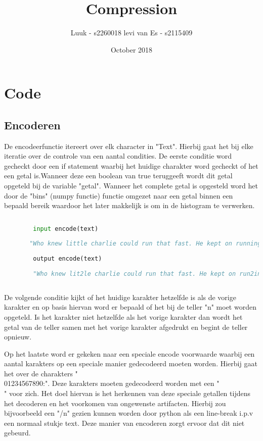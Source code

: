 \documentclass{article}
\title{Compression}
\author{Luuk - s2260018 levi van Es - s2115409 }
\date{October 2018}
\begin{document}
\maketitle

\section{Code}

    \subsection{Encoderen}
       De encodeerfunctie itereert over elk character in "Text". Hierbij gaat het bij elke iteratie over de controle van een aantal condities. De eerste conditie word gecheckt door een if statement waarbij het huidige charakter word gecheckt of het een getal is.Wanneer deze een boolean van true teruggeeft wordt dit getal opgeteld bij de variable "getal". Wanneer het complete getal is opgesteld word het door de "bins" (numpy functie) functie omgezet naar een getal binnen een bepaald bereik waardoor het later makkelijk is om in de histogram te verwerken.
       
       
       \begin{lstlisting}[frame=single, language=python]  % Start your code-block
        
        input encode(text)
        
       "Who knew little charlie could run that fast. He kept on running faster fasteer and fasteeeeeerr !"
        
        output encode(text) 
        
        "Who knew lit2le charlie could run that fast. He kept on run2ing faster faste2r and faste6r2 !"
 

        \end{lstlisting}

       
       De volgende conditie kijkt of het huidige karakter hetzelfde is als de vorige karakter en op basis hiervan word er bepaald of het bij de teller "n" moet worden opgeteld. Is het karakter niet hetzelfde als het vorige karakter dan wordt het getal van de teller samen met het vorige karakter afgedrukt en begint de teller opnieuw.
       \newline
       
       Op het laatste word er gekeken naar een speciale encode voorwaarde waarbij een aantal karakters op een speciale manier gedecodeerd moeten worden. Hierbij gaat het over de charakters "\\01234567890:". Deze karakters moeten gedecodeerd worden met een "\\" voor zich. Het doel hiervan is het herkennen van deze speciale getallen tijdens het decoderen en het voorkomen van ongewenste artifacten. Hierbij zou bijvoorbeeld een "/n" gezien kunnen worden door python als een line-break i.p.v een normaal stukje text. Deze manier van encoderen zorgt ervoor dat dit niet gebeurd.
       
\end{document}
